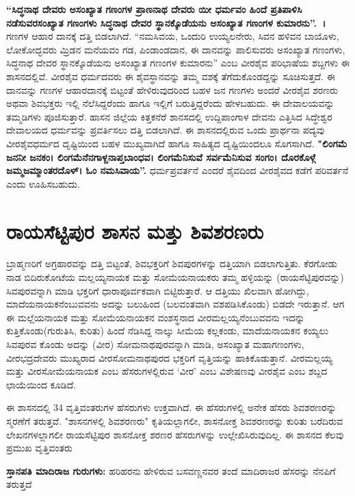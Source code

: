 \textbf{“ಸಿದ್ಧನಾಥ ದೇವರು ಅಸಂಖ್ಯಾತ ಗಣಂಗಳ ಪ್ರಾಣನಾಥ ದೇವರು ಯೀ ಧರ್ಮವಂ ಹಿಂದೆ ಪ್ರತಿಪಾಳಿಸಿ ನಡೆಸುವರಸಂಖ್ಯಾತ ಗಣಂಗಳು ಸಿದ್ಧನಾಥ ದೇವರ ಸ್ಥಾನಕ್ಕೊಡೆಯನು ಅಸಂಖ್ಯಾತ ಗಣಂಗಳ ಕುಮಾರನು”.~।} ಗಣಗಳ ಆಹಾರ ದಾನಕ್ಕೆ ದತ್ತಿ ಬಿಡಲಾಗಿದೆ. “ನಮಸಿವಯ, ಒಂದುರಿ ಉಯ್ಯಲನೇರು, ಸಿವನ ಹಳಿವನ ಬಾಯೊಳು, ಲೋಕೋದ್ಭವರು ಮ್ರಿಡನ ಮನೆಯವಂ ಗಡ, ಪಿಂಡಾಂಡದಾನ, ಈ ದಾನವನ್ನು ಪಾಲಿಸುವರು ಅಸಂಖ್ಯಾತ ಗಣಂಗಳು, ಸಿದ್ಧನಾಥ ದೇವರ ಸ್ಥಾನಕ್ಕೊಡೆಯನು ಅಸಂಖ್ಯಾತ ಗಣಂಗಳ ಕುಮಾರನು” ಎಂಬ ವೀರಶೈವ ಪರಿಭಾಷೆಯ ಶಬ್ದಗಳು ಈ ಶಾಸನದಲ್ಲಿವೆ. ವೀರಶೈವ ಧರ್ಮದವರು ಈ ಶೈವಸ್ಥಾನವನ್ನು ತಮ್ಮ ವಶಕ್ಕೆ ತೆಗೆದುಕೊಂಡದ್ದನ್ನು ಸೂಚಿಸುತ್ತದೆ. ಈ ದಾನವನ್ನು ಗಣಗಳ ಆಹಾರದಾನಕ್ಕೆ ಬಿಟ್ಟಂತೆ ಹೇಳಿರುವುದರಿಂದ ಬಹಳ ಜನ ಗಣಗಳು ಅಂದರೆ ವೀರಶೈವ ಶರಣರು ಅಥವಾ ಶಿವಭಕ್ತರು ಇಲ್ಲಿ ನೆಲೆಸಿದ್ದರೆಂದು ಹಾಗೂ ಇಲ್ಲಿಗೆ ಬರುತ್ತಿದ್ದರೆಂದು ಹೇಳಬಹುದು. ಈ ದೇವಾಲಯವನ್ನು ತಮ್ಮಡಿಗಳು ಪೂಜಿಸುತ್ತಾರೆ. ಹಾಸನ ಜಿಲ್ಲೆಯ ಕಿತ್ತಕನೆರೆ ಶಾನಸದಲ್ಲಿ ಉದ್ದಿಪಾಂಗಾಳ ದೇವನು ಎತ್ತಿಸಿದ ಸಿದ್ಧೇಶ್ವರ ದೇವಾಲಯದ ಧರ್ಮವನ್ನು ಪ್ರವರ್ತಿಸಲು ದತ್ತಿ ಬಿಡಲಾಗಿದೆ. ಈ ಶಾಸನದಲ್ಲಿರುವ ಒಂದು ಪ್ರಾರ್ಥನಾ ಪದ್ಯವು ವೀರಶೈವಧರ್ಮದ ದೃಷ್ಟಿಯಿಂದ ಬಹಳ ಮುಖ್ಯವಾಗಿದೆ ಹಾಗೂ ಸಾಹಿತ್ಯದ ದೃಷ್ಟಿಯಿಂದಲೂ ಸೊಗಸಾಗಿದೆ. \textbf{"ಲಿಂಗಮೆ ಜನನೀ ಜನಕಂ। ಲಿಂಗಮೆನೆನಗಾಳ್ದನಾಪ್ತಬಾಂಧವ। ಲಿಂಗಮೆನಿಸುವೆ ಸರ್ವಮೆನಿಸುವ ಸಂಗಂ। ದೊರಕೊಳ್ಗೆ ಜಮ್ಮಜಮ್ಮಾಂತರದೊಳ್​। ಓಂ ನಮಸಿವಾಯ”. }ಧರ್ಮಪ್ರವರ್ತನೆ ಎಂದರೆ ಶೈವದಿಂದ ವೀರಶೈವದ ಕಡೆಗೆ ಪರಿವರ್ತನೆ ಎಂದು ಊಹಿಸಬಹುದು.


\section{ರಾಯಸೆಟ್ಟಿಪುರ ಶಾಸನ ಮತ್ತು ಶಿವಶರಣರು}

ಬ್ರಾಹ್ಮಣರಿಗೆ ಅಗ್ರಹಾರವನ್ನು ದತ್ತಿ ಬಿಟ್ಟಂತೆ, ಶಿವಭಕ್ತರಿಗೆ ಶಿವಪುರಗಳನ್ನು ದತ್ತಿಯಾಗಿ ಬಿಡಲಾಗುತ್ತಿತು. ಕೆರಗೋಡು ನಾಡ ಬಿದಿರುಕೋಟೆಯ ಮಲ್ಲಯ್ಯನಾಯಕ ಮತ್ತು ಸೋಮೆಯನಾಯಕರು ತಮ್ಮ ಹಳ್ಳಿಯನ್ನು (ರಾಯಸೆಟ್ಟಿಪುರವನ್ನು) ಸಿವಪುರವನ್ನಾಗಿ ಮಾಡಿ ಭಕ್ತರಿಗೆ ಧಾರಾಪೂರ್ವಕವಾಗಿ ಬಿಟ್ಟಿರುತ್ತಾರೆ. ಆ ದತ್ತಿಯು ಖಿಲವಾಗಿ ಹೋಗಿದ್ದು, ಮಾದೆಯನಾಯಕನೆಂಬುವವನು ಅದನ್ನು ಬಲುಹಿಂದ (ಬಲವಂತವಾಗಿ ವಶಪಡಿಸಿಕೊಂಡು) ಬಿಡದೇ ಇರುತ್ತಾನೆ. ಆಗ ಈ ಮಲ್ಲೆಯನಾಯಕ ಮತ್ತು ಸೋಮೆಯನಾಯಕನ ವಂಶಸ್ಥನಾದ ವೀರಮಲ್ಲಯ್ಯನೆಂಬುವವನು ಇದನ್ನು ಕುತ್ತಿಕೊಂಡು(ಗುರುತಿಸಿ, ಕುರಿತು) ಹಿಂದೆ ನೆಡಿಸಿದ್ದ ನಾಲ್ಕು ಸೀಮೆಯ ಕಲ್ಲಕಂಡು, ಮಾದೆಯನಾಯಕನ ಕಯ್ಯಲು ಸಿವಪುರವ ಕೊಂಡು ಅದನ್ನು (ವೀರ) ಸೋಮನಾಥಪುರವನ್ನಾಗಿ ಮಾಡಿ, ಅಸಂಖ್ಯಾತ ಮಹಾಗಣಂಗಳು, ವೀರಭದ್ರದೇವರು ಮುಖ್ಯರಾದ ವೀರಸೋಮನಾಥಪುರದ ಭಕ್ತರಿಗೆ ವೃತ್ತಿಯನ್ನು ಹಾಕಿಕೊಡುತ್ತಾನೆ. ವೀರಮಲ್ಲಯ್ಯ ಮತ್ತು ವೀರಸೋಮೆಯನಾಯಕ ಎಂಬ ಹೆಸರುಗಳಲ್ಲಿರುವ ‘ವೀರ’ ಎಂಬ ವಿಶೇಷಣವು ವೀರಶೈವ ಎಂಬ ಶಬ್ದದ ಛಾಯೆಯಿಂದ ಕೂಡಿದೆ.

ಈ ಶಾಸನದಲ್ಲಿ 34 ವೃತ್ತಿವಂತರುಗಳ ಹೆಸರುಗಳು ಉಕ್ತವಾಗಿದೆ. ಈ ಹೆಸರುಗಳಲ್ಲಿ ಅನೇಕ ಹೆಸರು ಶಿವಶರಣರನ್ನು ಸ್ಮರಣೆಗೆ ತರುತ್ತವೆ. "ಶಾಸನಗಳಲ್ಲಿ ಶಿವಶರಣರು" ಕೃತಿಯಲ್ಲಾಗಲೀ, ಶಾಸನೋಕ್ತ ಶಿವಶರಣರನ್ನು ಕುರಿತು ಬರೆದಿರುವ ಲೇಖನಗಳಲ್ಲಾಗಲೀ ರಾಯಸೆಟ್ಟಿಪುರ ಶಾಸನೋಕ್ತ ಶರಣರ ಹೆಸರುಗಳನ್ನು ಉಲ್ಲೇಖಿಸಿರುವುದಿಲ್ಲ. ಈ ಶಾಸನದ ಕೆಲವು ಪ್ರಮುಖ ವೃತ್ತಿವಂತರು

\textbf{ಸ್ತಾನಪತಿ ಮಾದಿರಾಜ ಗುರುಗಳು:} ಹರಿಹರನು ಹೇಳಿರುವ ಬಸವಣ್ಣನವರ ತಂದೆ ಮಾದಿರಾಜರ ಹೆಸರನ್ನು ನೆನಪಿಗೆ ತರುತ್ತದೆ 

